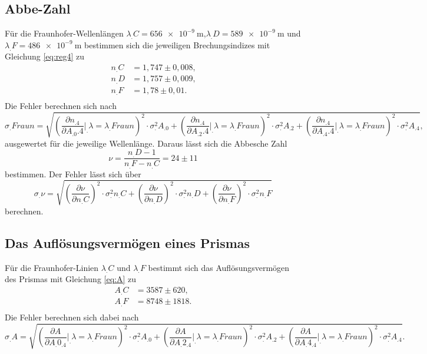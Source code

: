 \subsection{Abbe-Zahl}
Für die Fraunhofer-Wellenlängen $\lambda_.C=\SI{656e-9}{\metre}$,$\lambda_.D=\SI{589e-9}{\metre}$ und $\lambda_.F=\SI{486e-9}{\metre}$ bestimmen sich die jeweiligen Brechungsindizes mit Gleichung \eqref{eq:reg4} zu
\begin{align*}
n_.C&=1,747\pm 0,008\text{,}\\
n_.D&=1,757\pm 0,009\text{,}\\
n_.F&=1,78\pm 0,01\text{.}\\
\end{align*}
\noindent Die Fehler berechnen sich nach
\[
\sigma_.{Fraun}=\sqrt{\left(\frac{\partial n_.4}{\partial A_.0.4}\bigg|_.{\lambda=\lambda_.{Fraun}}\right)^2\cdot\sigma^2_.{A_.0}+\left(\frac{\partial n_.4}{\partial A_.2.4}\bigg|_.{\lambda=\lambda_.{Fraun}}\right)^2\cdot\sigma^2_.{A_.2}+\left(\frac{\partial n_.4}{\partial A_.4.4}\bigg|_.{\lambda=\lambda_.{Fraun}}\right)^2\cdot\sigma^2_.{A_.4}},
\]
ausgewertet für die jeweilige Wellenlänge.
Daraus lässt sich die Abbesche Zahl 
\[
\nu = \frac{n_.D-1}{n_.F-n_.C}=24 \pm 11
\]
bestimmen.
Der Fehler lässt sich über
\[
\sigma_.{\nu}=\sqrt{\left(\frac{\partial\nu}{\partial n_.C}\right)^2\cdot\sigma^2_.{n_.C} + \left(\frac{\partial\nu}{\partial n_.D}\right)^2\cdot\sigma^2_.{n_.D} + \left(\frac{\partial\nu}{\partial n_.F}\right)^2\cdot\sigma^2_.{n_.F}}
\]
berechnen.
\subsection{Das Auflösungsvermögen eines Prismas}
Für die Fraunhofer-Linien $\lambda_.C$ und $\lambda_.F$ bestimmt sich das Auflösungsvermögen des Prismas mit Gleichung \eqref{eq:A} zu
\begin{align*}
A_.C&=3587\pm 620\text{,}\\
A_.F&=8748\pm 1818\text{.}\\
\end{align*}
Die Fehler berechnen sich dabei nach
\[
\sigma_.A=\sqrt{\left(\frac{\partial A}{\partial A_.{0_.4}}\bigg|_.{\lambda=\lambda_.{Fraun}}\right)^2\cdot\sigma^2_.{A_.0}+\left(\frac{\partial A}{\partial A_.{2_.4}}\bigg|_.{\lambda=\lambda_.{Fraun}}\right)^2\cdot\sigma^2_.{A_.2}+\left(\frac{\partial A}{\partial A_.{4_.4}}\bigg|_.{\lambda=\lambda_.{Fraun}}\right)^2\cdot\sigma^2_.{A_.4}}\text{.}
\]